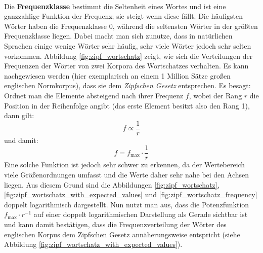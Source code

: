 \paragraph{}
Die \textbf{Frequenzklasse} bestimmt die Seltenheit eines Wortes und ist eine ganzzahlige Funktion der Frequenz; sie steigt wenn diese fällt.
Die häufigsten Wörter haben die Frequenzklasse 0, während die seltensten Wörter in der größten Frequenzklasse liegen.
Dabei macht man sich zunutze, dass in natürlichen Sprachen einige wenige Wörter sehr häufig, sehr viele Wörter jedoch sehr selten vorkommen.
Abbildung \ref{fig:zipf_wortschatz} zeigt, wie sich die Verteilungen der Frequenzen der Wörter von zwei Korpora des Wortschatzes verhalten.
Es kann nachgewiesen werden (hier exemplarisch an einem 1 Million Sätze großen englischen Normkorpus), dass sie dem \emph{Zipfschen Gesetz} \citep{zipf} entsprechen.
Es besagt: Ordnet man die Elemente absteigend nach ihrer Frequenz $f$, wobei der Rang $r$ die Position in der Reihenfolge angibt (das erste Element besitzt also den Rang 1), dann gilt:
\begin{equation*}
f \propto \frac{1}{r}
\end{equation*}
und damit:
\begin{equation}
f = f_{\max} \cdot \frac{1}{r}
\label{eqn:zipf}
\end{equation}
Eine solche Funktion ist jedoch sehr schwer zu erkennen, da der Wertebereich viele Größenordnungen umfasst und die Werte daher sehr nahe bei den Achsen liegen.
Aus diesem Grund sind die Abbildungen \ref{fig:zipf_wortschatz}, \ref{fig:zipf_wortschatz_with_expected_values} und \ref{fig:zipf_wortschatz_frequency} doppelt logarithmisch dargestellt.
Nun nutzt man aus, dass die Potenzfunktion $f_{\max} \cdot r^{-1}$ auf einer doppelt logarithmischen Darstellung als Gerade sichtbar ist\footnotemark{} und kann damit bestätigen,
dass die Frequenzverteilung der Wörter des englischen Korpus dem Zipfschen Gesetz annäherungsweise entspricht (siehe Abbildung \ref{fig:zipf_wortschatz_with_expected_values}).

